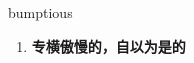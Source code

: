 
\begin{frame}
{\huge bumptious}
\begin{center}
\begin{enumerate}\Large
  \item \textbf{专横傲慢的，自以为是的}
\end{enumerate}
\end{center}
\end{frame}
